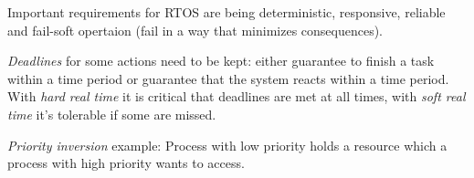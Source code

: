 \documentclass{article}
\begin{document}
\begin{multicols}{1}
Important requirements for RTOS are being deterministic, responsive, reliable and fail-soft opertaion (fail in a way that minimizes consequences).

\emph{Deadlines} for some actions need to be kept: either guarantee to finish a task within a time period or guarantee that the system reacts within a time period. With \emph{hard real time} it is critical that deadlines are met at all times, with \emph{soft real time} it's tolerable if some are missed.

\emph{Priority inversion} example: Process with low priority holds a resource which a process with high priority wants to access.

\end{multicols}
\end{document}
